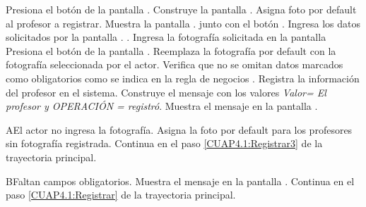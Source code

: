 	\begin{UCtrayectoria}
		\UCpaso[\UCactor] Presiona el botón  de la pantalla .
		\UCpaso[\UCsist] Construye la pantalla .
		\UCpaso[\UCsist] Asigna foto por default al profesor a registrar.
		\UCpaso[\UCsist] Muestra la pantalla . junto con el botón . 
		\UCpaso[\UCactor] Ingresa los datos solicitados por la pantalla . .\label{CUAP4.1:Registrar} 
		\UCpaso[\UCactor] Ingresa la fotografía solicitada en la pantalla
		\UCpaso Presiona el botón  de la pantalla .\label{CUAP4.1:Registrar3} 
		\UCpaso[\UCsist] Reemplaza la fotografía por default con la fotografía seleccionada por el actor.
		\UCpaso[\UCsist] Verifica que no se omitan datos marcados como obligatorios como se indica en la regla de negocios . 
		\UCpaso[\UCsist] Registra la información del profesor en el sistema. \label{CUAP4.1:Registrar2}
		\UCpaso[\UCsist] Construye el mensaje  con los valores \textit{Valor= El profesor y OPERACIÓN = registró}.
		\UCpaso[\UCsist] Muestra el mensaje   en la pantalla .
		
				
%		
		
	\end{UCtrayectoria}
	
		\begin{UCtrayectoriaA}{A}{El actor no ingresa la fotografía.}
		\UCpaso[\UCsist] Asigna la foto por default para los profesores sin fotografía registrada.
		\UCpaso[] Continua en el paso \ref{CUAP4.1:Registrar3} de la trayectoria principal.
	\end{UCtrayectoriaA}
	
	\begin{UCtrayectoriaA}{B}{Faltan campos obligatorios.}
		\UCpaso[\UCsist] Muestra el mensaje  en la pantalla  .
		\UCpaso[] Continua en el paso \ref{CUAP4.1:Registrar} de la trayectoria principal.
	\end{UCtrayectoriaA}
	

